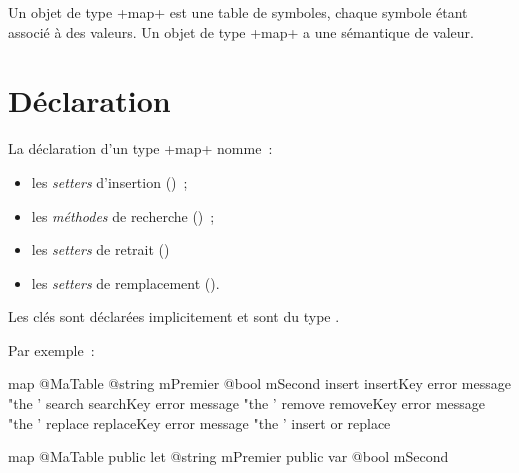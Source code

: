 



Un objet de type \ggst+map+ est une table de symboles, chaque symbole étant associé à des valeurs. Un objet de type \ggst+map+ a une sémantique de valeur.

\section{Déclaration}

La déclaration d'un type \ggst+map+ nomme~:
\begin{itemize}
  \item les \emph{setters} d'insertion ()~;
  \item les \emph{méthodes} de recherche ()~;
  \item les \emph{setters} de retrait ()~
  \item les \emph{setters} de remplacement ().
\end{itemize}

Les clés sont déclarées implicitement et sont du type .

Par exemple~:

\begin{galgas3}
map @MaTable {
  @string mPremier
  @bool mSecond
  insert insertKey error message "the '%
  search searchKey error message "the '%
  remove removeKey error message "the '%
  replace replaceKey error message "the '%
  insert or replace
}
\end{galgas3}


\begin{galgas4}
map @MaTable {
  public let @string mPremier
  public var @bool mSecond
}
\end{galgas4}







